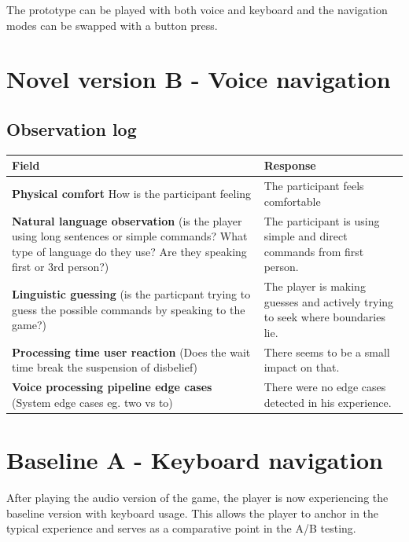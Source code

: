 The prototype can be played with both voice and keyboard and the navigation modes can be swapped with a button press. 


\section{Novel version B - Voice navigation}

\subsection{Observation log}
\begin{table}[H]
\centering
\begin{tabular}{|p{5cm}|p{10cm}|}
\hline
\textbf{Field} & \textbf{Response} \\ \hline
\textbf{Physical comfort} How is the participant feeling & The participant feels comfortable \\[1.5cm] \hline
\textbf{Natural language observation} (is the player using long sentences or simple commands? What type of language do they use? Are they speaking first or 3rd person?) & The participant is using simple and direct commands from first person. \\[1.5cm] \hline
\textbf{Linguistic guessing} (is the particpant trying to guess the possible commands by speaking to the game?) & The player is making guesses and actively trying to seek where boundaries lie. \\[1.5cm] \hline
\textbf{Processing time user reaction} (Does the wait time break the suspension of disbelief) & There seems to be a small impact on that. \\[1.5cm] \hline
\textbf{Voice processing pipeline edge cases} (System edge cases eg. two vs to)& There were no edge cases detected in his experience. \\[1.5cm] \hline
\end{tabular}
\end{table}


\section{Baseline A - Keyboard navigation}
After playing the audio version of the game, the player is now experiencing the baseline version with keyboard usage.
This allows the player to anchor in the typical experience and serves as a comparative point in the A/B testing.


